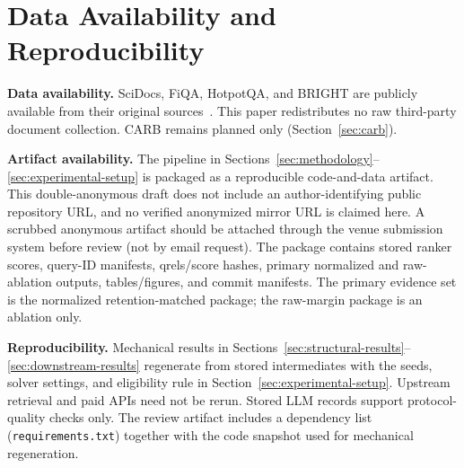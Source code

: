 \documentclass[manuscript,anonymous,review]{acmart}
\begin{document}
\section{Data Availability and Reproducibility}
\label{sec:data-availability}

\textbf{Data availability.} SciDocs, FiQA, HotpotQA, and BRIGHT are publicly
available from their original
sources~\cite{cohan2020scidocs,maia2018fiqa,yang2018hotpotqa,su2024bright}.
This paper redistributes no raw third-party document collection. CARB remains
planned only (Section~\ref{sec:carb}).

\textbf{Artifact availability.} The pipeline in
Sections~\ref{sec:methodology}--\ref{sec:experimental-setup} is packaged as a
reproducible code-and-data artifact. This double-anonymous draft does not
include an author-identifying public repository URL, and no verified anonymized
mirror URL is claimed here. A scrubbed anonymous artifact should be attached
through the venue submission system before review (not by email request). The
package contains stored ranker scores, query-ID manifests, qrels/score hashes,
primary normalized and raw-ablation outputs, tables/figures, and commit
manifests. The primary evidence set is the normalized retention-matched package;
the raw-margin package is an ablation only.

\textbf{Reproducibility.} Mechanical results in
Sections~\ref{sec:structural-results}--\ref{sec:downstream-results} regenerate
from stored intermediates with the seeds, solver settings, and eligibility rule
in Section~\ref{sec:experimental-setup}. Upstream retrieval and paid APIs need
not be rerun. Stored LLM records support protocol-quality checks only. The review
artifact includes a dependency list (\texttt{requirements.txt}) together with
the code snapshot used for mechanical regeneration.

\begin{acks}
\end{acks}



\end{document}
